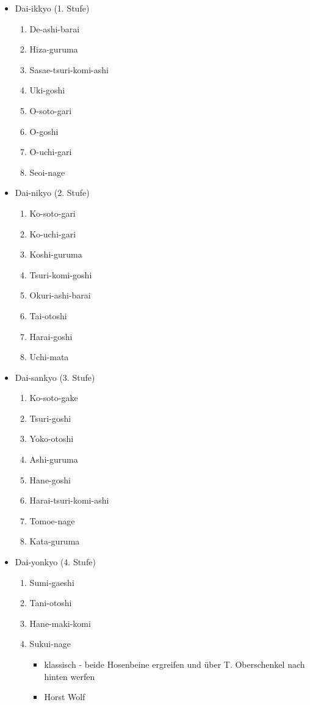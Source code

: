 \documentclass[justified, a4paper, notitlepage, captions=tableheading, nobib]{tufte-handout}
\begin{document}
\begin{itemize}
\item Dai-ikkyo (1. Stufe)
\begin{enumerate}
\item De-ashi-barai
\item Hiza-guruma
\item Sasae-tsuri-komi-ashi
\item Uki-goshi
\item O-soto-gari
\item O-goshi
\item O-uchi-gari
\item Seoi-nage
\end{enumerate}
\item Dai-nikyo (2. Stufe)
\begin{enumerate}
\item Ko-soto-gari
\item Ko-uchi-gari
\item Koshi-guruma
\item Tsuri-komi-goshi
\item Okuri-ashi-barai
\item Tai-otoshi
\item Harai-goshi
\item Uchi-mata
\end{enumerate}
\item Dai-sankyo (3. Stufe)
\begin{enumerate}
\item Ko-soto-gake
\item Tsuri-goshi
\item Yoko-otoshi
\item Ashi-guruma
\item Hane-goshi
\item Harai-tsuri-komi-ashi
\item Tomoe-nage
\item Kata-guruma
\end{enumerate}
\item Dai-yonkyo (4. Stufe)
\begin{enumerate}
\item Sumi-gaeshi
\item Tani-otoshi
\item Hane-maki-komi
\item Sukui-nage
\begin{itemize}
\item klassisch - beide Hosenbeine ergreifen und über T. Oberschenkel nach hinten werfen
\item Horst Wolf

\end{itemize}
\end{enumerate}
\end{itemize}
\end{document}
